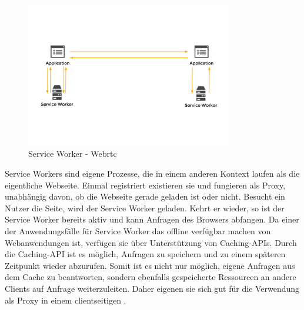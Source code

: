 \begin{figure}[!h]
	\centering
	\includegraphics[width=0.8\textwidth]{figures/service_worker_app}
	\caption[Service Worker - Webrtc]{Service Worker - Webrtc}
	\label{fig:mesh}
\end{figure}

Service Workers sind eigene Prozesse, die in einem anderen Kontext laufen als die eigentliche Webseite. Einmal registriert existieren sie und fungieren als Proxy, unabhängig davon, ob die Webseite gerade geladen ist oder nicht. Besucht ein Nutzer die Seite, wird der Service Worker geladen. Kehrt er wieder, so ist der Service Worker bereits aktiv und kann Anfragen des Browsers abfangen. Da einer der Anwendungsfälle für Service Worker das offline verfügbar machen von Webanwendungen ist, verfügen sie über Unterstützung von Caching-APIs. Durch die Caching-API ist es möglich, Anfragen zu speichern und zu einem späteren Zeitpunkt wieder abzurufen. Somit ist es nicht nur möglich, eigene Anfragen aus dem Cache zu beantworten, sondern ebenfalls gespeicherte Ressourcen an andere Clients auf Anfrage weiterzuleiten. Daher eigenen sie sich gut für die Verwendung als Proxy in einem clientseitigen \cdn.

